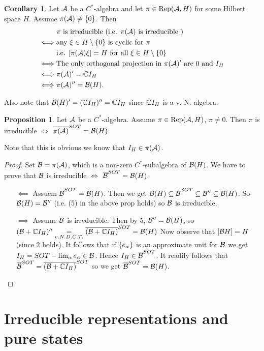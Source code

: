 \documentclass[10pt,english,a4paper]{article}
\theoremstyle{definition}
\newtheorem*{corollary}{Corollary}
\newtheorem*{proposition}{Proposition}
\DeclareMathOperator{\Rep}{Rep}
\begin{document}
\begin{corollary}
    Let $\mathcal{A}$ be a $C^*$-algebra and let $\pi \in \Rep(\As,H)$ for some 
Hilbert space $H$. Assume $\pi(\mathcal{A})\neq \{0\}$.
Then
\begin{align*}
    &\text{$\pi$ is irreducible (i.e. $\pi(\mathcal{A})$ is irreducible )}\\
\iff&\text{any $\xi \in H\setminus\{0\}$ is cyclic for $\pi$} \\
& \text{i.e. $[\pi(\mathcal{A})\xi] =H$ for all $\xi\in H\setminus \{0\}$} \\
\iff& \text{The only orthogonal projection in $\pi(\mathcal{A})'$ are $0$ and $I_H$} \\
\iff& \pi(\mathcal{A})' = \mathbb{C} I_H \\
\iff& \pi(\mathcal{A})'' = \mathcal{B}(H).
\end{align*}
\end{corollary}


Also note that $\mathcal{B}(H)' = (\mathbb{C} I_H)'' = \mathbb{C} I_H$  since $\mathbb{C} I_H$ is a v. N. algebra. 

\begin{proposition} Let $\mathcal{A}$ be a $C^*$-algebra.
    Assume $\pi \in \Rep(\As,H)$, $\pi\neq 0$. Then $\pi$ is irreducible 
$\iff$ $\overline{\pi(\mathcal{A})}^{SOT} = \mathcal{B}(H)$.
\end{proposition}
Note that this is obvious we know that $I_H \in \pi(\mathcal{A})$.
\begin{proof}
    Set $\mathcal{B} = \pi(\mathcal{A})$, which is a non-zero $C^*$-subalgebra of $\mathcal{B}(H)$.
We have to prove that $\mathcal{B}$ is irreducible $\iff$ $\overline{\mathcal{B}}^{SOT} = \mathcal{B}(H)$.
\begin{itemize}
    \item[$\impliedby$] Assuem $\overline{\mathcal{B}}^{SOT} = \mathcal{B}(H)$. Then we get 
$\mathcal{B}(H) \subseteq \overline{\mathcal{B}}^{SOT}\subseteq \mathcal{B}''\subseteq \mathcal{B}(H)$. So
$\mathcal{B}(H)= \mathcal{B}''$ (i.e. (5) in the above prop holds) so $\mathcal{B}$ is irreducible.
\item[$\implies$] Assume $\mathcal{B}$ is irreducible. Then by 5, $\mathcal{B}'' = \mathcal{B}(H)$, 
so $(\mathcal{B}+\mathbb{C} I_H)'' \underset{v.N. D.C.T.}{=} \overline{(\mathcal{B} + \mathbb{C} I_H)}^{SOT} = \mathcal{B}(H)$ 
Now observe that $[\mathcal{B} H] = H$ (since $2$ holds). It follows that if 
$\{ e_{\alpha}\}$ is an approximate unit for $\mathcal{B}$ we get $I_H = SOT-\lim_{\alpha}e_{\alpha} \in \mathcal{B}$.
Hence $I_{H} \in \overline{\mathcal{B}}^{SOT}$. It readily follows that 
$\overline{\mathcal{B}}^{SOT} = \overline{(\mathcal{B} + \mathbb{C} I_H)}^{SOT}$ so we get $\overline{\mathcal{B}}^{SOT} = \mathcal{B}(H)$.
\end{itemize}
\end{proof}


\section{Irreducible representations and pure states}
\end{document}
